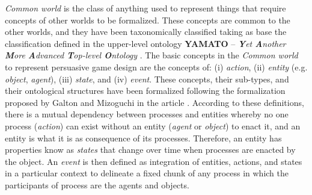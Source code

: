 \emph{Common world} is the class of anything used to represent things that require concepts of other worlds to be formalized. These concepts are common to the other worlds, and they have been taxonomically classified taking as base the classification defined in the upper-level ontology \textbf{YAMATO} – \emph{\textbf{Y}et \textbf{A}nother \textbf{M}ore \textbf{A}dvanced \textbf{T}op-level \textbf{O}ntology} \cite{Mizoguchi2010}.
The basic concepts in the \emph{Common world} to represent persuasive game design are the concepts of: (i) \emph{action}, (ii) \emph{entity} (e.g. \emph{object}, \emph{agent}), (iii) \emph{state}, and (iv) \emph{event}.
These concepts, their sub-types, and their ontological structures have been formalized following the formalization proposed by Galton and Mizoguchi in the article  \cite{GaltonMizoguchi2009}.
According to these definitions, there is a mutual dependency between processes and entities whereby no one process (\emph{action}) can exist without an entity (\emph{agent} or \emph{object}) to enact it, and an entity is what it is as consequence of its processes.
Therefore, an entity has properties know as \emph{states} that change over time when processes are enacted by the object.
An \emph{event} is then defined as integration of entities, actions, and states in a particular context to delineate a fixed chunk of any process in which the participants of process are the agents and objects.

